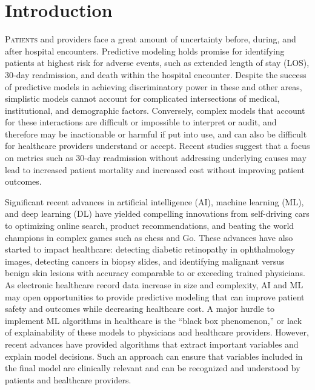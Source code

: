 \twocolumn
\section{Introduction}
\sloppy
\lettrine[lines=3,lraise=0.05,nindent=0pt]{\textcolor{NEJMGreyText}{P}}{atients} and providers
face a great amount of uncertainty before, during, and after hospital encounters.\@
Predictive modeling holds promise for identifying patients at highest risk for adverse events, 
such as extended length of stay (LOS), 30-day readmission, and death within the hospital encounter.
Despite the success of predictive models in achieving discriminatory power in these and other areas,
simplistic models cannot account for complicated intersections of medical, institutional, and demographic factors. 
Conversely, complex models that account for these interactions are difficult or impossible to interpret or audit, 
and therefore may be inactionable or harmful if put into use, 
and can also be difficult for healthcare providers understand or accept. \supercite{auerbach2018balancing,cabitza2017unintended,sniderman2015role}
Recent studies suggest that a focus on metrics such as 30-day readmission without addressing underlying causes 
may lead to increased patient mortality and increased cost without improving patient outcomes. \supercite{Wadhera2018}

Significant recent advances in artificial intelligence (AI), machine learning (ML), and deep learning (DL) 
have yielded compelling innovations from self-driving cars \supercite{bojarski2016end} to optimizing online search,\supercite{agirre2009personalizing}
product recommendations,\supercite{bobadilla2013recommender}
and beating the world champions in complex games such as chess and Go.\supercite{silver2018general}
These advances have also started to impact healthcare: 
detecting diabetic retinopathy in ophthalmology images,\supercite{gulshan2016development}
detecting cancers in biopsy slides,\supercite{coudray2018classification} 
and identifying malignant versus benign skin lesions
with accuracy comparable to or exceeding trained physicians.\supercite{esteva2017dermatologist} 
As electronic healthcare record data increase in size and complexity, 
AI and ML may open opportunities to provide predictive modeling that can improve 
patient safety and outcomes while decreasing healthcare cost. 
A major hurdle to implement ML algorithms in healthcare is the “black box phenomenon,” 
or lack of explainability of these models to physicians and healthcare providers. 
However, recent advances have provided algorithms that extract important variables and explain model decisions. 
Such an approach can ensure that variables included in the final model are clinically relevant 
and can be recognized and understood by patients and healthcare providers. 

